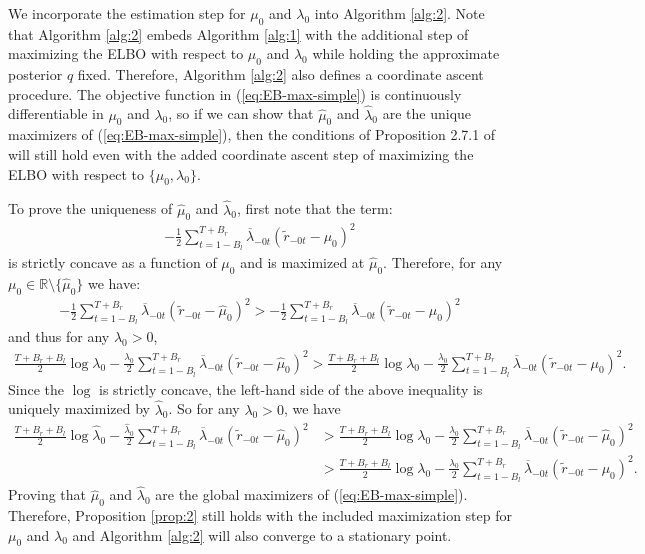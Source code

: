 We incorporate the estimation step for $\mu_0$ and $\lambda_0$ into Algorithm \ref{alg:2}. Note that Algorithm \ref{alg:2} embeds Algorithm \ref{alg:1} with the additional step of maximizing the ELBO with respect to $\mu_0$ and $\lambda_0$ while holding the approximate posterior $q$ fixed. Therefore, Algorithm \ref{alg:2} also defines a coordinate ascent procedure. The objective function in (\ref{eq:EB-max-simple}) is continuously differentiable in $\mu_0$ and $\lambda_0$, so if we can show that $\hat{\mu}_0$ and $\hat{\lambda}_0$ are the unique maximizers of (\ref{eq:EB-max-simple}), then the conditions of Proposition 2.7.1 of \cite{Bertsekas97} will still hold even with the added coordinate ascent step of maximizing the ELBO with respect to $\{\mu_0,\lambda_0\}$. 

To prove the uniqueness of $\hat{\mu}_0$ and $\hat{\lambda}_0$, first note that the term:
\begin{align*}
    -\frac{1}{2}\sum_{t=1-B_l}^{T+B_r} \overline{\lambda}_{-0t}\left(\tilde{r}_{-0t}-\mu_0\right)^2
\end{align*}
is strictly concave as a function of $\mu_0$ and is maximized at $\hat{\mu}_0$. Therefore, for any $\mu_0\in\mathbb{R}\setminus\{\hat{\mu}_0\}$ we have:
\begin{align*}
    -\frac{1}{2}\sum_{t=1-B_l}^{T+B_r} \overline{\lambda}_{-0t}\left(\tilde{r}_{-0t}-\hat{\mu}_0\right)^2 > -\frac{1}{2}\sum_{t=1-B_l}^{T+B_r} \overline{\lambda}_{-0t}\left(\tilde{r}_{-0t}-\mu_0\right)^2
\end{align*}
and thus for any $\lambda_0>0$,
\begin{align*}
    \frac{T+B_r +B_l}{2}\log\lambda_0-\frac{\lambda_0}{2}\sum_{t=1-B_l}^{T+B_r} \overline{\lambda}_{-0t}\left(\tilde{r}_{-0t}-\hat{\mu}_0\right)^2 > \frac{T+B_r +B_l}{2}\log\lambda_0-\frac{\lambda_0}{2}\sum_{t=1-B_l}^{T+B_r} \overline{\lambda}_{-0t}\left(\tilde{r}_{-0t}-\mu_0\right)^2.
\end{align*}
Since the $\log$ is strictly concave, the left-hand side of the above inequality is uniquely maximized by $\hat{\lambda}_0$. So for any $\lambda_0 > 0$, we have 
\begin{align*}
    \frac{T+B_r +B_l}{2}\log\hat{\lambda}_0-\frac{\hat{\lambda}_0}{2}\sum_{t=1-B_l}^{T+B_r} \overline{\lambda}_{-0t}\left(\tilde{r}_{-0t}-\hat{\mu}_0\right)^2 &> \frac{T+B_r +B_l}{2}\log\lambda_0-\frac{\lambda_0}{2}\sum_{t=1-B_l}^{T+B_r} \overline{\lambda}_{-0t}\left(\tilde{r}_{-0t}-\hat{\mu}_0\right)^2 \\
    &> \frac{T+B_r +B_l}{2}\log\lambda_0-\frac{\lambda_0}{2}\sum_{t=1-B_l}^{T+B_r} \overline{\lambda}_{-0t}\left(\tilde{r}_{-0t}-\mu_0\right)^2.
\end{align*}
Proving that $\hat{\mu}_0$ and $\hat{\lambda}_0$ are the global maximizers of (\ref{eq:EB-max-simple}). Therefore, Proposition \ref{prop:2} still holds with the included maximization step for $\mu_0$ and $\lambda_0$ and Algorithm \ref{alg:2} will also converge to a stationary point. 

